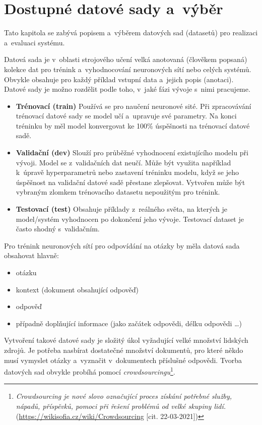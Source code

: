 \chapter{Dostupné datové sady a~výběr}
\label{available_datasets}
Tato kapitola se zabývá popisem a~výběrem datových sad (datasetů) pro realizaci a~evaluaci systému.\par
Datová sada je v~oblasti strojového učení velká anotovaná (člověkem popsaná) kolekce dat pro trénink a~vyhodnocování neuronových sítí nebo celých systémů. Obvykle obsahuje pro každý příklad vstupní data a~jejich popis (anotaci).\\
Datové sady je možno rozdělit podle toho, v~jaké fázi vývoje s~nimi pracujeme.
\begin{itemize}
    \item \textbf{Trénovací (train)} Používá se pro naučení neuronové sité. Při zpracovávání trénovací datové sady se model učí a~upravuje své parametry. Na konci tréninku by měl model konvergovat ke 100\% úspěšnosti na trénovací datové sadě.
    \item \textbf{Validační (dev)} Slouží pro průběžné vyhodnocení existujícího modelu při vývoji. Model se z~validačních dat neučí. Může být využita například k~úpravě hyperparametrů nebo zastavení tréninku modelu, když se jeho úspěšnost na validační datové sadě přestane zlepšovat. Vytvořen může být vybraným zlomkem trénovacího datasetu nepoužitým pro trénink.
    \item \textbf{Testovací (test)} Obsahuje příklady z~reálného světa, na kterých je model/systém vyhodnocen po dokončení jeho vývoje. Testovací dataset je často shodný s~validačním.
\end{itemize}
Pro trénink neuronových sítí pro odpovídání na otázky by měla datová sada obsahovat hlavně:
\begin{itemize}
    \item otázku
    \item kontext (dokument obsahující odpověď)
    \item odpověď
    \item případně doplňující informace (jako začátek odpovědi, délku odpovědi \dots)
\end{itemize}
Vytvoření takové datové sady je složitý úkol vyžadující velké množství lidských zdrojů. Je potřeba nasbírat dostatečné množství dokumentů, pro které někdo musí vymyslet otázky a~vyznačit v~dokumentech příslušné odpovědi. Tvorba datových sad obvykle probíhá pomocí \emph{crowdsourcingu}\footnote{\emph{Crowdsourcing je nové slovo označující proces získání potřebné služby, nápadů, příspěvků, pomoci při řešení problémů od velké skupiny lidí.} (\url{https://wikisofia.cz/wiki/Crowdsourcing} [cit. 22-03-2021])}.


